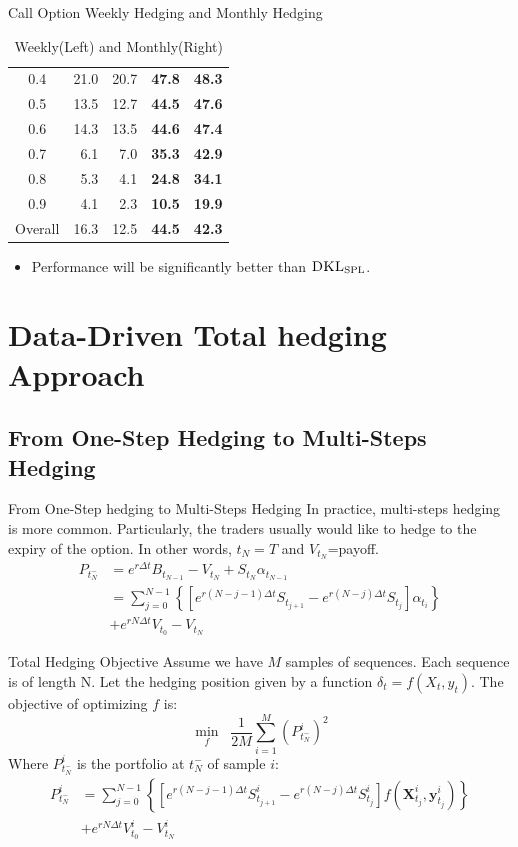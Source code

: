 \documentclass[10pt,table,mathserif]{beamer}
\newcommand{\vy}{\mathbf{y}}
\newcommand{\DKLs}{\bf\textsc{DKL}_{\text{SPL}}}
\begin{document}
\begin{frame}[fragile]{Call Option Weekly Hedging and Monthly Hedging}
\begin{table}[htp!]
{\begin{tabular}{|c|r r r r|}
  0.4          &21.0    & 20.7 &\textbf{47.8} &\textbf{48.3}\\
  0.5          &13.5    & 12.7 &\textbf{44.5} &\textbf{47.6}\\
  0.6          &14.3    & 13.5 &\textbf{44.6} &\textbf{47.4}\\
  0.7          &6.1     & 7.0  &\textbf{35.3} &\textbf{42.9}\\
  0.8          &5.3     & 4.1  &\textbf{24.8} &\textbf{34.1}\\
  0.9          &4.1     & 2.3  &\textbf{10.5} &\textbf{19.9}\\
  Overall      &16.3    & 12.5 &\textbf{44.5} &\textbf{42.3} \\
  \hline
\end{tabular}
}\caption{Weekly(Left) and Monthly(Right)}
\end{table}
\begin{itemize}
  \item Performance will be significantly better than $\DKLs$.
\end{itemize}
\end{frame}

\section{Data-Driven Total hedging Approach}
\subsection{From One-Step Hedging to Multi-Steps Hedging}
\begin{frame}{From One-Step hedging to Multi-Steps Hedging}
In practice,  multi-steps hedging is more common. Particularly, the traders usually  would like to hedge to the expiry of the option. In other words,  $t_N=T$ and $V_{t_N}$=payoff.
\[ \begin{split}
P_{t_N^-}&=e^{r \Delta t} B_{t_{N-1}}- V_{t_N}+ S_{t_N} \alpha_{t_{N-1}}  \\
&=\sum_{j=0}^{N-1}\left\{ \left[e^{r (N-j-1) \Delta t} S_{t_{j+1}}-e^{r (N-j) \Delta t}S_{t_{j}}\right] \alpha_{t_i} \right\}\\
&+e^{r N \Delta t} V_{t_0}-V_{t_N}
\end{split}
\]
\end{frame}


\begin{frame}{Total Hedging Objective}
Assume we have $M$ samples of sequences. Each sequence is of length N. Let the hedging position given by a function $\delta_t = f (X_t,y_t)$.
The objective of optimizing $f$ is: 
\[
\min_{f} \;\;\frac{1}{2 M} \sum_{i=1}^M (P^i_{t_N^-})^2
\]
Where $P^i_{t_N^-}$ is the portfolio at $t_N^-$ of sample $i$:
\[ \begin{split}
P^i_{t_N^-} &=\sum_{j=0}^{N-1}\left\{ \left[e^{r (N-j-1) \Delta t} S^i_{t_{j+1}}-e^{r (N-j) \Delta t}S^i_{t_{j}}\right] f(\mathbf{X}^i_{t_j},\vy^i_{t_{j}})\right\}\\
&+e^{r N \Delta t} V^i_{t_0}-V^i_{t_N}
\end{split}
\]
\end{frame}
\end{document}
